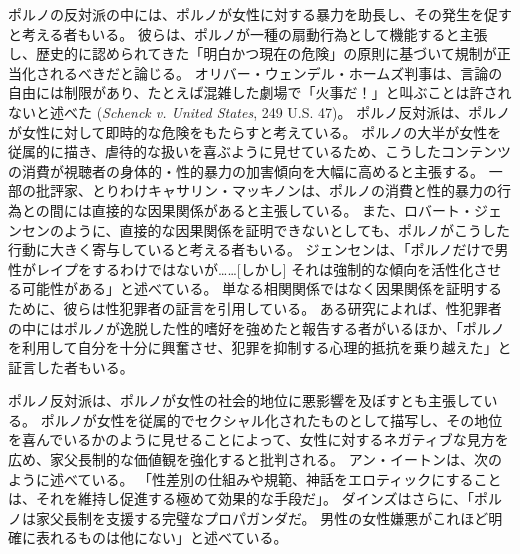 \documentclass[paper=a4,book,openany]{jlreq}
\begin{document}
ポルノの反対派の中には、ポルノが女性に対する暴力を助長し、その発生を促すと考える者もいる。
彼らは、ポルノが一種の扇動行為として機能すると主張し、歴史的に認められてきた「明白かつ現在の危険」の原則に基づいて規制が正当化されるべきだと論じる。
オリバー・ウェンデル・ホームズ判事は、言論の自由には制限があり、たとえば混雑した劇場で「火事だ！」と叫ぶことは許されないと述べた
(\emph{Schenck v. United States}, 249 U.S. 47)。
ポルノ反対派は、ポルノが女性に対して即時的な危険をもたらすと考えている。
ポルノの大半が女性を従属的に描き、虐待的な扱いを喜ぶように見せているため、こうしたコンテンツの消費が視聴者の身体的・性的暴力の加害傾向を大幅に高めると主張する。
一部の批評家、とりわけキャサリン・マッキノンは、ポルノの消費と性的暴力の行為との間には直接的な因果関係があると主張している\citep{mackinnon94:_pornog}。
また、ロバート・ジェンセンのように、直接的な因果関係を証明できないとしても、ポルノがこうした行動に大きく寄与していると考える者もいる。
ジェンセンは、「ポルノだけで男性がレイプをするわけではないが……[しかし] それは強制的な傾向を活性化させる可能性がある」と述べている\citep[p.103]{jensen07:gettingoff}。
単なる相関関係ではなく因果関係を証明するために、彼らは性犯罪者の証言を引用している。
ある研究によれば、性犯罪者の中にはポルノが逸脱した性的嗜好を強めたと報告する者がいるほか、「ポルノを利用して自分を十分に興奮させ、犯罪を抑制する心理的抵抗を乗り越えた」と証言した者もいる\citep[p.70]{marshall00:_revis_use_pornog_sexual_offen}。

ポルノ反対派は、ポルノが女性の社会的地位に悪影響を及ぼすとも主張している。
ポルノが女性を従属的でセクシャル化されたものとして描写し、その地位を喜んでいるかのように見せることによって、女性に対するネガティブな見方を広め、家父長制的な価値観を強化すると批判される\citep{hald13:_pornog_sexis_attit_among_heter}。
アン・イートンは、次のように述べている。
「性差別の仕組みや規範、神話をエロティックにすることは、それを維持し促進する極めて効果的な手段だ」\citep{eaton07:sensibleantiporn}。
ダインズはさらに、「ポルノは家父長制を支援する完璧なプロパガンダだ。
男性の女性嫌悪がこれほど明確に表れるものは他にない」と述べている\citep{bindel10:_truth_porn_indus}。
\end{document}
